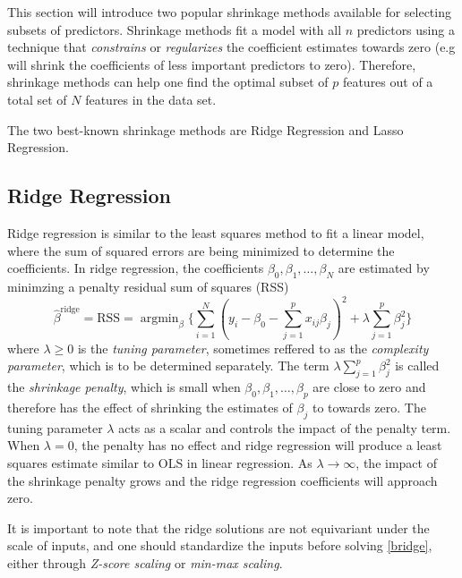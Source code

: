 \documentclass{article}
\DeclareMathOperator*{\argmin}{argmin}
\numberwithin{equation}{subsection}
\begin{document}
This section will introduce two popular shrinkage methods available for selecting subsets of predictors. Shrinkage methods fit a model with all $n$ predictors using a technique that
\textit{constrains} or \textit{regularizes} the coefficient estimates towards zero (e.g will shrink
the coefficients of less important predictors to zero). Therefore, shrinkage methods can help one find the optimal subset
of $p$ features out of a total set of $N$ features in the data set.

The two best-known shrinkage methods are Ridge Regression and Lasso Regression. 

\subsection{Ridge Regression}
Ridge regression is similar to the least squares method to fit a linear model, where the sum of squared errors are being
minimized to determine the coefficients. In ridge regression, the coefficients $\beta_{0}, \beta_{1}, \ldots, \beta_{N}$ 
are estimated by minimzing a penalty residual sum of squares (RSS)
\begin{equation}
  \label{bridge}
  \hat{\beta}^{\text{ridge}} = \text{RSS} = \argmin_{\beta}\bigg\{\sum^{N}_{i=1}(y_{i} - \beta_{0} - \sum^{p}_{j=1} x_{ij}\beta_{j})^{2} + \lambda \sum^{p}_{j=1} \beta^{2}_{j}   \bigg\}
\end{equation}
where $\lambda \geq 0$ is the \textit{tuning parameter}, sometimes reffered to as the \textit{complexity parameter},
which is to be determined separately. The term $\lambda \sum^{p}_{j=1} \beta^{2}_{j}$ is called the \textit{shrinkage penalty},
which is small when $\beta_{0}, \beta_{1}, \ldots, \beta_{p}$ are close to zero and therefore has the effect of shrinking
the estimates of $\beta_{j}$ to towards zero. The tuning parameter $\lambda$ acts as a scalar and controls
the impact of the penalty term. When $\lambda = 0$, the penalty has no effect and ridge regression will produce a
least squares estimate similar to OLS in linear regression. As $\lambda \to \infty$, the impact of the shrinkage penalty
grows and the ridge regression coefficients will approach zero.

It is important to note that the ridge solutions are not equivariant under the scale of inputs, and one should
standardize the inputs before solving \eqref{bridge}, either through \textit{Z-score scaling} or \textit{min-max scaling}.
\end{document}

